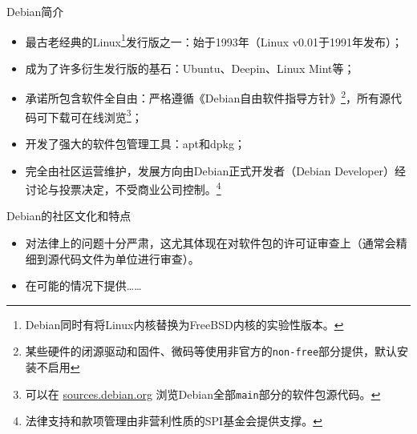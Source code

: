 
\begin{frame}{Debian简介}
	\begin{itemize}
		\item 最古老经典的Linux\footnote{Debian同时有将Linux内核替换为FreeBSD内核的实验性版本。}发行版之一：始于1993年（Linux v0.01于1991年发布）；
		\item 成为了许多衍生发行版的基石：Ubuntu、Deepin、Linux Mint等；
		\item 承诺所包含软件全自由：严格遵循《Debian自由软件指导方针》\footnote{某些硬件的闭源驱动和固件、微码等使用非官方的\texttt{non-free}部分提供，默认安装不启用}，所有源代码可下载可在线浏览\footnote{可以在 \href{https://sources.debian.org}{sources.debian.org} 浏览Debian全部\texttt{main}部分的软件包源代码。}；
		\item 开发了强大的软件包管理工具：apt和dpkg；
		\item 完全由社区运营维护，发展方向由Debian正式开发者（Debian Developer）经讨论与投票决定，不受商业公司控制。\footnote{法律支持和款项管理由非营利性质的SPI基金会提供支撑。}
	\end{itemize}
\end{frame}

\begin{frame}{Debian的社区文化和特点}
	\begin{itemize}
		\item 对法律上的问题十分严肃，这尤其体现在对软件包的许可证审查上（通常会精细到源代码文件为单位进行审查）。
		\item 在可能的情况下提供……
	\end{itemize}
\end{frame}
